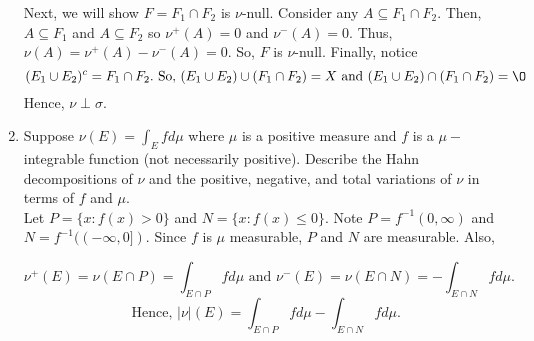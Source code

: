 \begin{enumerate}
Next, we will show $F = F_1 \cap F_2$ is $\nu$-null. Consider any $A \subseteq F_1 \cap F_2$. Then, $A \subseteq F_1$ and $A \subseteq F_2$ so $\nu^+(A)=0$ and $\nu^-(A)=0$. Thus, $\nu(A)=\nu^+(A)-\nu^-(A)=0$. So, $F$ is $\nu$-null.
Finally, notice
\[
(E_1 \cup E_2)^c = F_1 \cap F_2. \text{ So, } (E_1 \cup E_2) \cup (F_1 \cap F_2) = X \text{ and } (E_1 \cup E_2) \cap (F_1 \cap F_2) = \O
\]
Hence, $\nu \perp \sigma$.
\item Suppose $\nu(E) = \int_E f d \mu$ where $\mu$ is a positive measure and $f$ is a $\mu-$integrable function (not necessarily positive). Describe the Hahn decompositions of $\nu$ and the positive, negative, and total variations of $\nu$ in terms of $f$ and $\mu$. 	
\\
Let $P= \{x : f(x) > 0\}$ and $N = \{ x: f(x) \leq 0 \}$. Note $P=f^{-1}(0, \infty)$ and $N = f^{-1}((-\infty, 0])$. Since $f$ is $\mu$ measurable, $P$ and $N$ are measurable.  Also,

\[
\nu^+(E)= \nu(E \cap P)= \int_{E \cap P}f d \mu \text{ and } \nu^-(E) = \nu(E \cap N) = - \int_{E \cap N} f d \mu.
\]
\[
 \text{ Hence, } |\nu|(E) = \int_{E \cap P}f d \mu- \int_{E \cap N} f d \mu.
\]
\end{enumerate}
